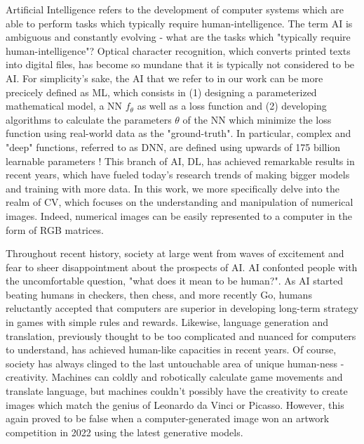 Artificial Intelligence refers to the development of computer systems which are able to perform tasks which typically require 
human-intelligence. The term \ac{AI} is ambiguous and constantly evolving - what are the tasks which "typically require human-intelligence"? 
Optical character recognition, which converts printed texts into digital files, has become so mundane that it is typically not 
considered to be \ac{AI}. For simplicity's sake, the \ac{AI} that we refer to in our work can be more precicely defined as 
\ac{ML}, which consists in (1) designing a parameterized mathematical model, a \ac{NN} $f_\theta$ as well as a loss function and 
(2) developing algorithms to calculate the parameters $\theta$ of the \ac{NN} which minimize the loss 
function using real-world data as the "ground-truth". In particular, complex and "deep" functions, referred to as 
\ac{DNN}, are defined using upwards of 175 billion learnable parameters \citep{gpt3}! This branch of \ac{AI}, \ac{DL}, 
has achieved remarkable results in recent years, which have fueled today's research trends of making bigger models and training 
with more data. In this work, we more specifically delve into the realm of \ac{CV}, which focuses on the understanding and manipulation of 
numerical images. Indeed, numerical images can be easily
represented to a computer in the form of RGB matrices.


Throughout recent history, society at large went from waves of excitement and fear to sheer disappointment about the prospects 
of \ac{AI}. \ac{AI} confonted people with the uncomfortable question, "what does it mean to be human?". As \ac{AI} started beating 
humans in checkers, then chess, and more recently Go, humans reluctantly accepted that computers are 
superior in developing long-term strategy in games with simple rules and rewards. Likewise, language generation and translation, previously 
thought to be too complicated and nuanced for computers to understand, has achieved human-like capacities in recent years. Of course,
society has always clinged to the last untouchable area of unique human-ness - creativity. Machines can coldly and robotically 
calculate game movements and translate language, but machines couldn't possibly have the creativity to create images which match 
the genius of Leonardo da Vinci or Picasso. However, this again proved to be false when a computer-generated image won an artwork
competition  in 2022 using the latest generative models. 

